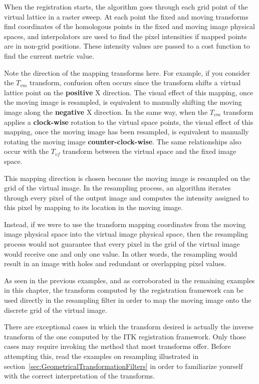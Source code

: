 When the registration starts, the algorithm goes through each grid point of the
virtual lattice in a raster sweep. At each point the fixed
and moving transforms find coordinates of the homologous points in the fixed
and moving image physical spaces, and interpolators are used to find the pixel
intensities if mapped points are in non-grid positions. These intensity values
are passed to a cost function to find the current metric value.

Note the direction of the mapping transforms here. For example,
if you consider the $T_{vm}$ transform, confusion often occurs since
the transform shifts a virtual lattice point on the \textbf{positive}
X direction. The visual effect of this mapping, once the moving
image is resampled, is equivalent to manually shifting the moving
image along the \textbf{negative} X direction. In the same way, when
the $T_{vm}$ transform applies a \textbf{clock-wise} rotation to the
virtual space points, the visual effect of this mapping, once the
moving image has been resampled, is equivalent to manually rotating
the moving image \textbf{counter-clock-wise}. The same relationships
also occur with the $T_{vf}$ transform between the virtual space and
the fixed image space.

This mapping direction is chosen because the moving image is resampled
on the grid of the virtual image. In the resampling process,
an algorithm iterates through every pixel of the output image
and computes the intensity assigned to this pixel by
mapping to its location in the moving image.

Instead, if we were to use the transform mapping coordinates from the
moving image physical space into the virtual image physical space,
then the resampling process would not guarantee that every pixel in
the grid of the virtual image would receive one and only one value.
In other words, the resampling would result in an image with
holes and redundant or overlapping pixel values.

As seen in the previous examples, and as corroborated in the remaining
examples in this chapter, the transform computed by the registration
framework can be used directly in the resampling filter in order to
map the moving image onto the discrete grid of the virtual image.

There are exceptional cases in which the transform desired is actually
the inverse transform of the one computed by the ITK registration framework.
Only those cases may require invoking the 
method that most transforms offer. Before attempting this,
read the examples on resampling illustrated in
section~\ref{sec:GeometricalTransformationFilters} in order to
familiarize yourself with the correct interpretation of the transforms.

